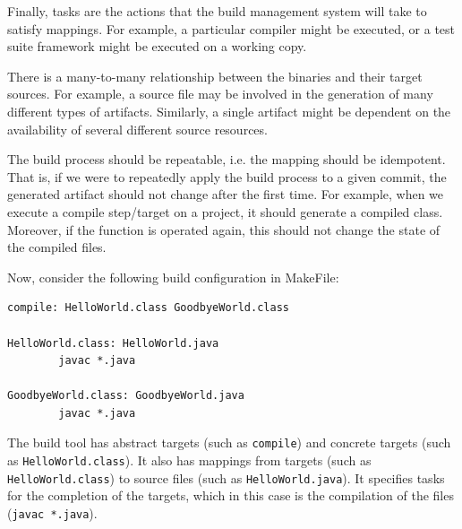 \documentclass[a4paper, openany]{memoir}
\begin{document}
Finally, tasks are the actions that the build management system will take to satisfy mappings. For example, a particular compiler might be executed, or a test suite framework might be executed on a working copy.

There is a many-to-many relationship between the binaries and their target sources. For example, a source file may be involved in the generation of many different types of artifacts. Similarly, a single artifact might be dependent on the availability of several different source resources.

The build process should be repeatable, i.e. the mapping should be idempotent. That is, if we were to repeatedly apply the build process to a given commit, the generated artifact should not change after the first time. For example, when we execute a compile step/target on a project, it should generate a compiled class. Moreover, if the function is operated again, this should not change the state of the compiled files.

Now, consider the following build configuration in MakeFile:
\begin{verbatim}
compile: HelloWorld.class GoodbyeWorld.class

HelloWorld.class: HelloWorld.java
        javac *.java
        
GoodbyeWorld.class: GoodbyeWorld.java
        javac *.java
\end{verbatim}
The build tool has abstract targets (such as \texttt{compile}) and concrete targets (such as \texttt{HelloWorld.class}). It also has mappings from targets (such as \texttt{HelloWorld.class}) to source files (such as \texttt{HelloWorld.java}). It specifies tasks for the completion of the targets, which in this case is the compilation of the files (\texttt{javac *.java}).
\end{document}

